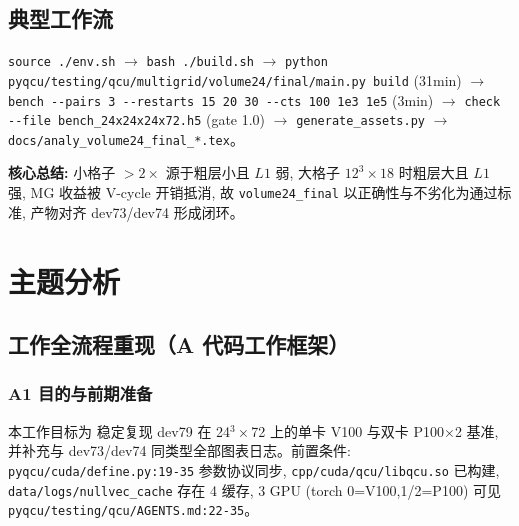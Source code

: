 \documentclass[UTF8]{ctexart}
\begin{document}
\subsection{典型工作流}
\texttt{\nolinkurl{source ./env.sh}} $\to$ \texttt{\nolinkurl{bash ./build.sh}} $\to$ \texttt{\nolinkurl{python pyqcu/testing/qcu/multigrid/volume24/final/main.py build}} (31min) $\to$ \texttt{\nolinkurl{bench --pairs 3 --restarts 15 20 30 --cts 100 1e3 1e5}} (3min) $\to$ \texttt{\nolinkurl{check --file bench_24x24x24x72.h5}} (gate 1.0) $\to$ \texttt{\nolinkurl{generate_assets.py}} $\to$ \texttt{\nolinkurl{docs/analy_volume24_final_*.tex}}。

\begin{ideabox}
\textbf{核心总结:} 小格子 $>2\times$ 源于粗层小且 $L1$ 弱, 大格子 $12^3\times18$ 时粗层大且 $L1$ 强, MG 收益被 V-cycle 开销抵消, 故 \texttt{\nolinkurl{volume24_final}} 以正确性与不劣化为通过标准, 产物对齐 dev73/dev74 形成闭环。
\end{ideabox}

\section{主题分析}
\subsection{工作全流程重现（A 代码工作框架）}

\subsubsection{A1 目的与前期准备}
本工作目标为 \textcolor{struct}{稳定复现 dev79 在 24$^3\times$72 上的单卡 V100 与双卡 P100$\times$2 基准, 并补充与 dev73/dev74 同类型全部图表日志}。前置条件: \texttt{\nolinkurl{pyqcu/cuda/define.py:19-35}} 参数协议同步, \texttt{\nolinkurl{cpp/cuda/qcu/libqcu.so}} 已构建, \texttt{\nolinkurl{data/logs/nullvec_cache}} 存在 4 缓存, 3 GPU (torch 0=V100,1/2=P100) 可见 \textcolor{evidence}{\texttt{\nolinkurl{pyqcu/testing/qcu/AGENTS.md:22-35}}}。
\end{document}

